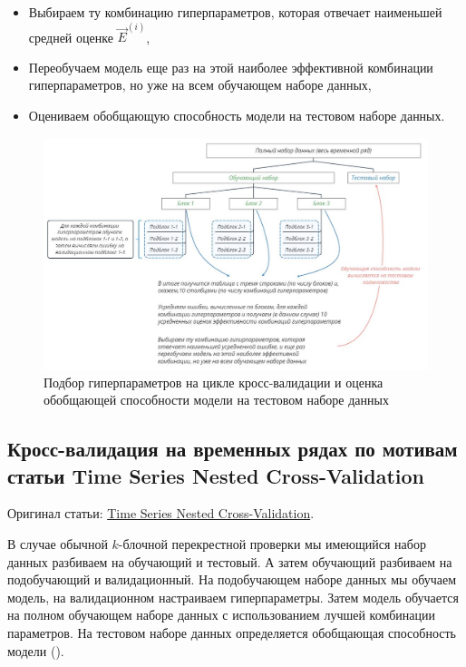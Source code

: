\documentclass[%
	11pt,
	a4paper,
	utf8,
		]{article}
\begin{document}
\begin{itemize}
	\item Выбираем ту комбинацию гиперпараметров, которая отвечает наименьшей средней оценке $ \vec{E}^{(i)} $,
	
	\item Переобучаем модель еще раз на этой наиболее эффективной комбинации гиперпараметров, но уже на всем обучающем наборе данных,
	
	\item Оцениваем обобщающую способность модели на тестовом наборе данных.
\end{itemize}

\begin{figure}[h]
	\centering
	\includegraphics[scale=0.8]{figures/cross-val-time-series.jpg}
	\caption{ Подбор гиперпараметров на цикле кросс-валидации и оценка обобщающей способности модели на тестовом наборе данных }\label{fig:cv_time_ser}
\end{figure}

\subsection{Кросс-валидация на временных рядах по мотивам статьи Time Series Nested Cross-Validation}

Оригинал статьи: \href{https://towardsdatascience.com/time-series-nested-cross-validation-76adba623eb9}{Time Series Nested Cross-Validation}.

В случае обычной $ k $-блочной перекрестной проверки мы имеющийся набор данных разбиваем на обучающий и тестовый. А затем обучающий разбиваем на подобучающий и валидационный. На подобучающем наборе данных мы обучаем модель, на валидационном настраиваем гиперпараметры. Затем модель обучается на полном обучающем наборе данных с использованием лучшей комбинации параметров. На тестовом наборе данных определяется обобщающая способность модели ().
\end{document}
